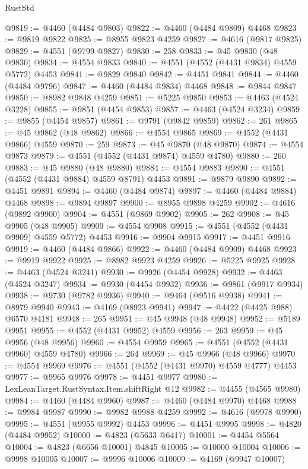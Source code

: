 \begin{lexlean}{RustStd}
\begin{coremodule}
@9819 := @4460 (@4484 @9803)
@9822 := @4460 (@4484 @9809) @4468
@9823 := @9819 @9822
@9825 := @8955 @9823 @4259
@9827 := @4616 (@9817 @9825)
@9829 := @4551 (@9799 @9827)
@9830 := 258
@9833 := @45 @9830 (@48 @9830)
@9834 := @4554 @9833
@9840 := @4551 (@4552 (@4431 @9834) @4559 @5772) @4453
@9841 := @9829 @9840
@9842 := @4451 @9841
@9844 := @4460 (@4484 @9796)
@9847 := @4460 (@4484 @9834) @4468
@9848 := @9844 @9847
@9850 := @8982 @9848 @4259
@9851 := @5225 @9850
@9853 := @4463 (@4524 @3228)
@9855 := @9851 (@4454 @9853)
@9857 := @4463 (@4524 @3234)
@9859 := @9855 (@4454 @9857)
@9861 := @9791 (@9842 @9859)
@9862 := 261
@9865 := @45 @9862 (@48 @9862)
@9866 := @4554 @9865
@9869 := @4552 (@4431 @9866) @4559
@9870 := 259
@9873 := @45 @9870 (@48 @9870)
@9874 := @4554 @9873
@9879 := @4551 (@4552 (@4431 @9874) @4559 @4780)
@9880 := 260
@9883 := @45 @9880 (@48 @9880)
@9884 := @4554 @9883
@9890 := @4551 (@4552 (@4431 @9884) @4559 @8791) @4453
@9891 := @9879 @9890
@9892 := @4451 @9891
@9894 := @4460 (@4484 @9874)
@9897 := @4460 (@4484 @9884) @4468
@9898 := @9894 @9897
@9900 := @8955 @9898 @4259
@9902 := @4616 (@9892 @9900)
@9904 := @4551 (@9869 @9902)
@9905 := 262
@9908 := @45 @9905 (@48 @9905)
@9909 := @4554 @9908
@9915 := @4551 (@4552 (@4431 @9909) @4559 @5772) @4453
@9916 := @9904 @9915
@9917 := @4451 @9916
@9919 := @4460 (@4484 @9866)
@9922 := @4460 (@4484 @9909) @4468
@9923 := @9919 @9922
@9925 := @8982 @9923 @4259
@9926 := @5225 @9925
@9928 := @4463 (@4524 @3241)
@9930 := @9926 (@4454 @9928)
@9932 := @4463 (@4524 @3247)
@9934 := @9930 (@4454 @9932)
@9936 := @9861 (@9917 @9934)
@9938 := @9730 (@9782 @9936)
@9940 := @9464 (@9516 @9938)
@9941 := @8979 @9940
@9943 := @4169 (@8923 @9941)
@9947 := @4422 (@4425 @988) @6570 @4181
@9948 := 265
@9951 := @45 @9948 (@48 @9948)
@9952 := @5189 @9951
@9955 := @4552 (@4431 @9952) @4559
@9956 := 263
@9959 := @45 @9956 (@48 @9956)
@9960 := @4554 @9959
@9965 := @4551 (@4552 (@4431 @9960) @4559 @4780)
@9966 := 264
@9969 := @45 @9966 (@48 @9966)
@9970 := @4554 @9969
@9976 := @4551 (@4552 (@4431 @9970) @4559 @4777) @4453
@9977 := @9965 @9976
@9978 := @4451 @9977
@9980 := LexLeanTarget.RustSyntax.Item.shiftRight @12
@9982 := @4455 (@4565 @9980)
@9984 := @4460 (@4484 @9960)
@9987 := @4460 (@4484 @9970) @4468
@9988 := @9984 @9987
@9990 := @9982 @9988 @4259
@9992 := @4616 (@9978 @9990)
@9995 := @4551 (@9955 @9992) @4453
@9996 := @4451 @9995
@9998 := @4820 (@4484 @9952)
@10000 := @4823 (@5633 @6417)
@10001 := @4454 @5564
@10004 := @4823 (@6656 @10001) @4845
@10005 := @10000 @10004
@10006 := @9998 @10005
@10007 := @9996 @10006
@10009 := @4169 (@9947 @10007)

\end{coremodule}
\end{lexlean}
